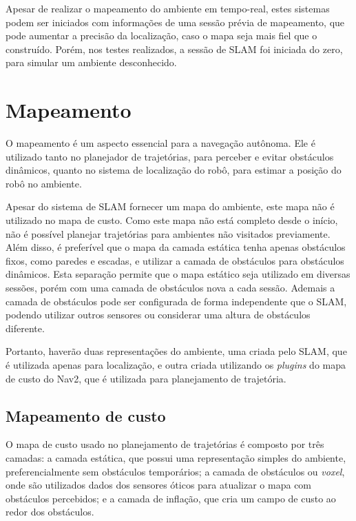 \documentclass[repeatfields,xlists,xpacks,oneside,yearsonly]{ufrgscca}
\begin{document}
Apesar de realizar o mapeamento do ambiente em tempo-real, estes
sistemas podem ser iniciados com informações de uma sessão prévia de
mapeamento, que pode aumentar a precisão da localização, caso o mapa
seja mais fiel que o construído. Porém, nos testes realizados, a
sessão de SLAM foi iniciada do zero, para simular um ambiente
desconhecido.

\section{Mapeamento}

O mapeamento é um aspecto essencial para a navegação autônoma. Ele é
utilizado tanto no planejador de trajetórias, para perceber e evitar
obstáculos dinâmicos, quanto no sistema de localização do robô, para
estimar a posição do robô no ambiente.

Apesar do sistema de SLAM fornecer um mapa do ambiente, este mapa não
é utilizado no mapa de custo. Como este mapa não está completo desde
o início, não é possível planejar trajetórias para ambientes não
visitados previamente. Além disso, é preferível que o mapa da camada
estática tenha apenas obstáculos fixos, como paredes e escadas, e
utilizar a camada de obstáculos para obstáculos dinâmicos. Esta
separação permite que o mapa estático seja utilizado em diversas
sessões, porém com uma camada de obstáculos nova a cada sessão.
Ademais a camada de obstáculos pode ser configurada de forma
independente que o SLAM, podendo utilizar outros sensores ou
considerar uma altura de obstáculos diferente.

Portanto, haverão duas representações do ambiente, uma criada pelo
SLAM, que é utilizada apenas para localização, e outra criada
utilizando os \textit{plugins} do mapa de custo do Nav2, que é
utilizada para planejamento de trajetória.

\subsection{Mapeamento de custo}

O mapa de custo usado no planejamento de trajetórias é composto por
três camadas: a camada estática, que possui uma representação simples
do ambiente, preferencialmente sem obstáculos temporários; a camada
de obstáculos ou \textit{voxel}, onde são utilizados dados dos
sensores óticos para atualizar o mapa com obstáculos percebidos; e a
camada de inflação, que cria um campo de custo ao redor dos
obstáculos.
\end{document}
